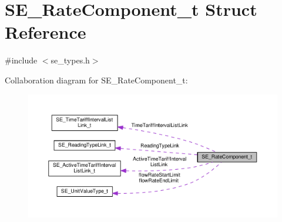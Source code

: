 \hypertarget{structSE__RateComponent__t}{}\section{S\+E\+\_\+\+Rate\+Component\+\_\+t Struct Reference}
\label{structSE__RateComponent__t}


{\ttfamily \#include $<$se\+\_\+types.\+h$>$}



Collaboration diagram for S\+E\+\_\+\+Rate\+Component\+\_\+t\+:\nopagebreak
\begin{figure}[H]
\begin{center}
\leavevmode
\includegraphics[width=350pt]{structSE__RateComponent__t__coll__graph}
\end{center}
\end{figure}
